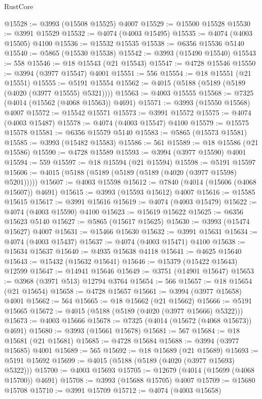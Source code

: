 \begin{lexlean}{RustCore}
\begin{coremodule}
@15528 := @3993 (@15508 @15525) @4007
@15529 := @15500 @15528
@15530 := @3991 @15529
@15532 := @4074 (@4003 @15495)
@15535 := @4074 (@4003 @15505) @4100
@15536 := @15532 @15535
@15538 := @6356 @15536 @5140
@15540 := @5865 (@15530 @15538)
@15542 := @3993 (@15490 @15540)
@15543 := 558
@15546 := @18 @15543 (@21 @15543)
@15547 := @4728 @15546
@15550 := @3994 (@3977 @15547) @4001
@15551 := 556
@15554 := @18 @15551 (@21 @15551)
@15555 := @5191 @15554
@15562 := @4015 (@5188 (@5189 (@5189 (@4020 (@3977 @15555) @5321))))
@15563 := @4003 @15555
@15568 := @7325 (@4014 (@15562 (@4068 @15563)) @4691)
@15571 := @3993 (@15550 @15568) @4007
@15572 := @15542 @15571
@15573 := @3991 @15572
@15575 := @4074 (@4003 @15487)
@15578 := @4074 (@4003 @15547) @4100
@15579 := @15575 @15578
@15581 := @6356 @15579 @5140
@15583 := @5865 (@15573 @15581)
@15585 := @3993 (@15482 @15583)
@15586 := 561
@15589 := @18 @15586 (@21 @15586)
@15590 := @4728 @15589
@15593 := @3994 (@3977 @15590) @4001
@15594 := 559
@15597 := @18 @15594 (@21 @15594)
@15598 := @5191 @15597
@15606 := @4015 (@5188 (@5189 (@5189 (@5189 (@4020 (@3977 @15598) @5201)))))
@15607 := @4003 @15598
@15612 := @7840 (@4014 (@15606 (@4068 @15607)) @4691)
@15615 := @3993 (@15593 @15612) @4007
@15616 := @15585 @15615
@15617 := @3991 @15616
@15619 := @4074 (@4003 @15479)
@15622 := @4074 (@4003 @15590) @4100
@15623 := @15619 @15622
@15625 := @6356 @15623 @5140
@15627 := @5865 (@15617 @15625)
@15630 := @3993 (@15474 @15627) @4007
@15631 := @15466 @15630
@15632 := @3991 @15631
@15634 := @4074 (@4003 @15437)
@15637 := @4074 (@4003 @15471) @4100
@15638 := @15634 @15637
@15640 := @4935 @15638 @4118
@15641 := @4625 @15640
@15643 := @15432 (@15632 @15641)
@15646 := @15379 (@15422 @15643) @12599
@15647 := @14941 @15646
@15649 := @3751 (@14901 @15647)
@15653 := @3968 (@3971 @513) @12794 @3764
@15654 := 566
@15657 := @18 @15654 (@21 @15654)
@15658 := @4728 @15657
@15661 := @3994 (@3977 @15658) @4001
@15662 := 564
@15665 := @18 @15662 (@21 @15662)
@15666 := @5191 @15665
@15672 := @4015 (@5188 (@5189 (@4020 (@3977 @15666) @5322)))
@15673 := @4003 @15666
@15678 := @7325 (@4014 (@15672 (@4068 @15673)) @4691)
@15680 := @3993 (@15661 @15678)
@15681 := 567
@15684 := @18 @15681 (@21 @15681)
@15685 := @4728 @15684
@15688 := @3994 (@3977 @15685) @4001
@15689 := 565
@15692 := @18 @15689 (@21 @15689)
@15693 := @5191 @15692
@15699 := @4015 (@5188 (@5189 (@4020 (@3977 @15693) @5322)))
@15700 := @4003 @15693
@15705 := @12679 (@4014 (@15699 (@4068 @15700)) @4691)
@15708 := @3993 (@15688 @15705) @4007
@15709 := @15680 @15708
@15710 := @3991 @15709
@15712 := @4074 (@4003 @15658)

\end{coremodule}
\end{lexlean}
